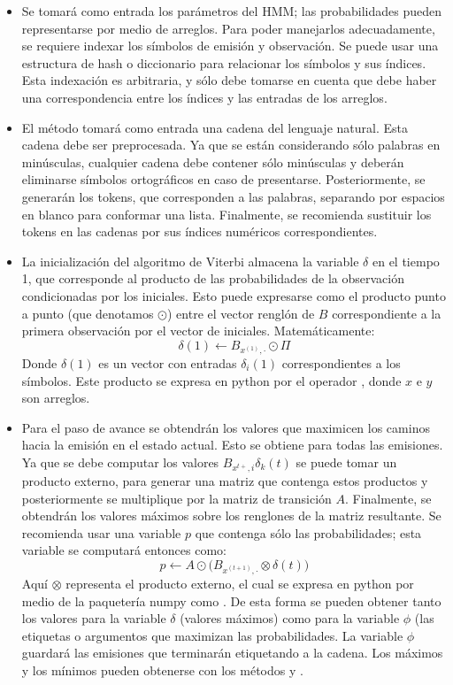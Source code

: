 \begin{itemize}
    \item Se tomará como entrada los parámetros del HMM; las probabilidades pueden representarse por medio de arreglos. Para poder manejarlos adecuadamente, se requiere indexar los símbolos de emisión y observación. Se puede usar una estructura de hash o diccionario para relacionar los símbolos y sus índices. Esta indexación es arbitraria, y sólo debe tomarse en cuenta que debe haber una correspondencia entre los índices y las entradas de los arreglos. 

    \item El método tomará como entrada una cadena del lenguaje natural. Esta cadena debe ser preprocesada. Ya que se están considerando sólo palabras en minúsculas, cualquier cadena debe contener sólo minúsculas y deberán eliminarse símbolos ortográficos en caso de presentarse. Posteriormente, se generarán los tokens, que corresponden a las palabras, separando por espacios en blanco para conformar una lista. Finalmente, se recomienda sustituir los tokens en las cadenas por sus índices numéricos correspondientes.

    \item La inicialización del algoritmo de Viterbi almacena la variable $\delta$ en el tiempo 1, que corresponde al producto de las probabilidades de la observación condicionadas por los iniciales. Esto puede expresarse como el producto punto a punto (que denotamos $\odot$) entre el vector renglón de $B$ correspondiente a la primera observación por el vector de iniciales. Matemáticamente:
    $$\delta(1) \leftarrow B_{x^{(1)}, \cdot} \odot \Pi$$
    Donde $\delta(1)$ es un vector con entradas $\delta_i(1)$ correspondientes a los símbolos. Este producto se expresa en python por el operador , donde $x$ e $y$ son arreglos.

    \item Para el paso de avance se obtendrán los valores que maximicen los caminos hacia la emisión en el estado actual. Esto se obtiene para todas las emisiones. Ya que se debe computar los valores $B_{x^{t+}, i} \delta_k(t)$ se puede tomar un producto externo, para generar una matriz que contenga estos productos y posteriormente se multiplique por la matriz de transición $A$. Finalmente, se obtendrán los valores máximos sobre los renglones de la matriz resultante. Se recomienda usar una variable $p$ que contenga sólo las probabilidades; esta variable se computará entonces como:
    $$p\leftarrow A \odot \Big( B_{x^{(t+1)}, \cdot} \otimes \delta(t) \Big)$$
    Aquí $\otimes$ representa el producto externo, el cual se expresa en python por medio de la paquetería numpy como .  De esta forma se pueden obtener tanto los valores para la variable $\delta$ (valores máximos) como para la variable $\phi$ (las etiquetas o argumentos que maximizan las probabilidades. La variable $\phi$ guardará las emisiones que terminarán etiquetando a la cadena. Los máximos y los mínimos pueden obtenerse con los métodos  y .


\end{itemize}
